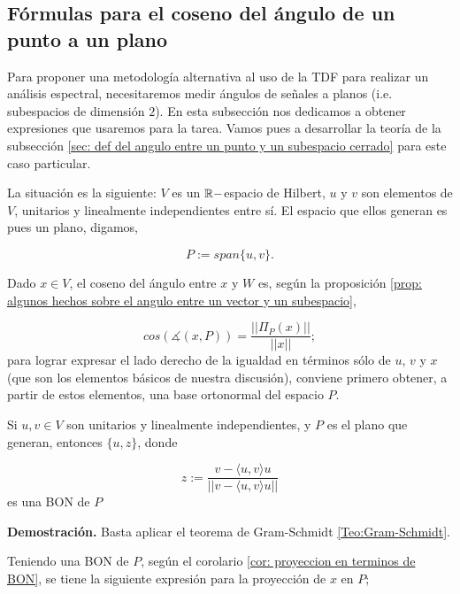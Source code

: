 \subsection{Fórmulas para el coseno del ángulo de un punto a un plano}
\label{ap: Caso particular en el que el subespacio en cuestión es un plano}

Para proponer una 
metodología 
alternativa al uso de la TDF
para realizar un análisis espectral,
necesitaremos medir ángulos de señales a planos
(i.e. subespacios de dimensión $2$).
En esta subsección nos dedicamos a 
obtener expresiones que usaremos para la tarea. Vamos pues a 
desarrollar la teoría de la subsección
\ref{sec: def del angulo entre un punto y un subespacio cerrado}
para este caso particular.

La situación es la siguiente: $V$ es un $\mathbb{R}-$espacio
de Hilbert, $u$ y $v$ son elementos de $V$,
unitarios y linealmente
independientes entre sí. El espacio que ellos generan
es pues un plano, digamos,


\[
P := span \{ u, v \}.
\]

\noindent
Dado $x \in V$,
el coseno del ángulo entre $x$ y $W$ es,
según la proposición
\ref{prop: algunos hechos sobre el angulo entre un vector y un subespacio},

\begin{equation}
\label{eq0: 19Marzo}
cos \left( \measuredangle (x, P) \right) = 
\frac{|| \Pi_{P}(x) ||}{||x||};
\end{equation}
para lograr expresar el lado derecho de la igualdad en términos
sólo de $u$, $v$ y $x$ (que son los elementos básicos de
nuestra discusión), conviene primero obtener, a partir 
de estos elementos, una base
ortonormal del espacio $P$.


\begin{obs}
Si $u, v \in V$ son unitarios y linealmente independientes, y $P$
es el plano que generan, entonces
$\{ u, z \}$, donde

\begin{equation}
\label{eq2: 19Marzo}
z:= \frac{v- \langle u, v \rangle u}{||v- \langle u, v \rangle u||}
\end{equation}
es una BON de $P$
\end{obs}
\noindent
\textbf{Demostración.}
Basta aplicar el teorema de Gram-Schmidt 
\ref{Teo:Gram-Schmidt}.
\QEDB
\vspace{0.2cm}

Teniendo una BON de $P$, según el 
corolario 
\ref{cor: proyeccion en terminos de BON}, se tiene la siguiente
expresión para la proyección de $x$ en $P$;

